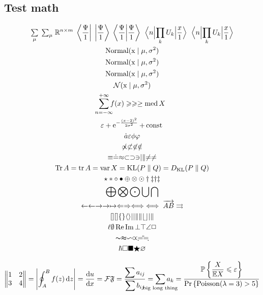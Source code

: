 \documentclass[a4paper,11pt]{article}
\begin{document}
  \subsection*{Test math}
    \begin{gather*}
      {\textstyle \underset{\mu}{\sum} \; \sum_{\mu}} \; \R^{n\times m}\; \bra{\frac{\Psi}{1}} \; \ket{\frac{\Psi}{1}} \;
      \braket{\frac{\Psi}{1}} \;
      \matrixelement{n}{\prod_k U_k}{\frac{x}{1}} \;
      \mel{n}{\prod_k U_k}{\frac{x}{1}} \\
      \text{Normal}(\mathrm{x} \mid \mu, \sigma^2 ) \\
      \textnormal{Normal}(\mathrm{x} \mid \mu, \sigma^2 ) \\
      \mathrm{Normal}(\mathrm{x} \mid \mu, \sigma^2 ) \\
      \mathcal{N}(\mathrm{x} \mid \mu, \sigma^2 ) \\
      \sum_{\mathclap{n=-\infty}}^{+\infty} f(x) \geqslant \geq \ge \med X \\
      \eps + \e^{-\frac{(x-2)^2}{2\sigma ^2}} + \const{} \\
      \dot{a} \epsilon \phi \varphi \\
      \not\propto \not\subset \not\in \notin \\
      \equiv \doteq \approx \subset \supset \ni \mid \parallel \neq \ne \\
      \Tr A = \tr A = \var X = \KL{P}{Q} = \DKL{P}{Q} \\
      \star \ast \circ \bullet \oplus \otimes \odot \dagger \ddagger \text{\dag \ddag} \\
      \bigoplus \bigotimes \bigodot \bigcup \bigcap \\
      \leftarrow \gets \rightarrow \to \mapsto
      \Leftarrow \Rightarrow \Longleftrightarrow \iff \overrightarrow{AB} \rightrightarrows \\
      []\lbrack \rbrack \lbrace \rbrace \langle \rangle
      | \vert \| \Vert \lfloor \rfloor \arrowvert \Arrowvert \\
      \ell \emptyset \Re \Im \bot \top \angle \Box \\
      \thicksim \thickapprox \backsim \varpropto \risingdotseq \fallingdotseq \\
      \hbar \square \blacksquare \bigstar \varnothing
    \end{gather*}

    \begin{equation}
      \begin{Vmatrix}
        1 & 2 \\
        3 & 4
      \end{Vmatrix}
      =
      \abs{\oint_{A}^{B} f(z) \ud z}
      =
      \frac{\d u}{\d x}
      = \mathcal{F}\mathfrak{F}
      = \frac{\displaystyle \sum a_{ij} }{\displaystyle \sum b_{ij} }
      = \sum_{\mathclap{\text{big long thing}}} a_k
      = \frac{\displaystyle \P{\frac{X}{\E X} \leq \epsilon}}
             {\displaystyle \Pr{\mathrm{Poisson}(\lambda=3) > 5}}
    \end{equation}
\end{document}
